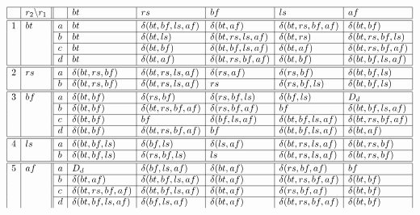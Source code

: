 \begin{table*}[!]
\footnotesize
\[
\begin{array}{|l|l||l|l|l|l|l|l|}\hline
& r_2\backslash r_1 &  & bt & rs & bf & ls & af \\\hline\hline
%
1 & bt &
               a & bt & \delta(bt,bf,ls,af) & \delta(bt,af) & \delta(bt,rs,bf,af) & \delta(bt,bf) \\
\cline{3-8} && b & bt & \delta(bt,ls) & \delta(bt,rs,ls,af) & \delta(bt,rs) & \delta(bt,rs,bf,ls) \\
\cline{3-8} && c & bt & \delta(bt,bf) & \delta(bt,bf,ls,af) & \delta(bt,af) & \delta(bt,rs,bf,af)\\
\cline{3-8} && d & bt & \delta(bt,af) & \delta(bt,rs,bf,af) & \delta(bt,bf) & \delta(bt,bf,ls,af) \\
\hline\hline
2 & rs&
               a & \delta(bt,rs,bf) & \delta(bt,rs,ls,af) & \delta(rs,af) & \delta(rs,bf) & \delta(bt,bf,ls)\\
\cline{3-8} && b & \delta(bt,rs,bf) & \delta(bt,rs,ls,af) & rs & \delta(rs,bf,ls) & \delta(bt,bf,ls)\\
\hline\hline
3 &  bf &
               a & \delta(bt,bf) & \delta(rs,bf) & \delta(rs,bf,ls) & \delta(bf,ls) & D_d\\
\cline{3-8} && b & \delta(bt,bf) & \delta(bt,rs,bf,af) & \delta(rs,bf,af) & bf & \delta(bt,bf,ls,af)\\
\cline{3-8} && c & \delta(bt,bf) & bf & \delta(bf,ls,af) & \delta(bt,bf,ls,af) & \delta(bt,rs,bf,af)\\
\cline{3-8} && d & \delta(bt,bf) & \delta(bt,rs,bf,af) & bf & \delta(bt,bf,ls,af) & \delta(bt,af)\\
\hline\hline
4 & ls &
               a & \delta(bt,bf,ls) & \delta(bf,ls) & \delta(ls,af) & \delta(bt,rs,ls,af) & \delta(bt,rs,bf)\\
\cline{3-8} && b & \delta(bt,bf,ls) & \delta(rs,bf,ls) & ls & \delta(bt,rs,ls,af) & \delta(bt,rs,bf)\\
\hline\hline
5 & af &
               a & D_d & \delta(bf,ls,af) & \delta(bt,af) & \delta(rs,bf,af) & bf\\
\cline{3-8} && b & \delta(bt,af) & \delta(bt,bf,ls,af) & \delta(bt,af) & \delta(bt,rs,bf,af) & \delta(bt,bf)\\
\cline{3-8} && c & \delta(bt,rs,bf,af) & \delta(bt,bf,ls,af) & \delta(bt,af) & \delta(rs,bf,af) & \delta(bt,bf)\\
\cline{3-8} && d & \delta(bt,bf,ls,af) & \delta(bf,ls,af) & \delta(bt,af) & \delta(bt,rs,bf,af) & \delta(bt,bf)\\

\end{array}\]
\end{table*}

